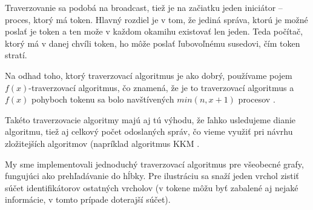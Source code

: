 Traverzovanie sa podobá na broadcast, tiež je na začiatku jeden iniciátor -- proces, ktorý má token.
Hlavný rozdiel je  v tom, že jediná správa, ktorú je možné poslať je token a ten može v každom
okamihu existovať len jeden. Teda počítač, ktorý má v danej chvíli token, ho môže poslať ľubovoľnému
susedovi, čím token stratí.

Na odhad toho, ktorý traverzovací algoritmus je ako dobrý, používame pojem $f(x)$-traverzovací
algoritmus, čo znamená, že je to traverzovací algoritmus a $f(x)$ pohyboch tokenu sa bolo
navštívených $min(n, x+1)$ procesov \cite{tel2000}.

Takéto traverzovacie algoritmy majú aj tú výhodu, že ľahko usledujeme dianie algoritmu, tiež aj celkový počet odoslaných
správ, čo vieme využiť pri návrhu zložitejších algoritmov (napríklad algoritmus
KKM \cite{korach1990}.

My sme implementovali jednoduchý traverzovací algoritmus pre všeobecné grafy, fungujúci ako 
prehľadávanie do hĺbky. Pre ilustráciu sa snaží jeden vrchol zistiť súčet identifikátorov ostatných
vrcholov (v tokene môžu byť zabalené aj nejaké informácie, v tomto prípade doterajší súčet).







